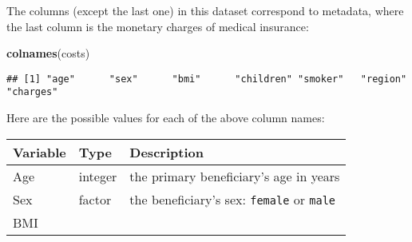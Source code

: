 \documentclass[]{article}
\newenvironment{Shaded}{\begin{snugshade}}{\end{snugshade}}
\newcommand{\KeywordTok}[1]{\textcolor[rgb]{0.13,0.29,0.53}{\textbf{#1}}}
\newcommand{\NormalTok}[1]{#1}
\begin{document}
The columns (except the last one) in this dataset correspond to
metadata, where the last column is the monetary charges of medical
insurance:

\begin{Shaded}
\begin{Highlighting}[]
\KeywordTok{colnames}\NormalTok{(costs)}
\end{Highlighting}
\end{Shaded}

\begin{verbatim}
## [1] "age"      "sex"      "bmi"      "children" "smoker"   "region"   "charges"
\end{verbatim}

Here are the possible values for each of the above column names:

\begin{longtable}[]{@{}lll@{}}
\toprule
\begin{minipage}[b]{0.27\columnwidth}\raggedright
Variable\strut
\end{minipage} & \begin{minipage}[b]{0.18\columnwidth}\raggedright
Type\strut
\end{minipage} & \begin{minipage}[b]{0.46\columnwidth}\raggedright
Description\strut
\end{minipage}\tabularnewline
\midrule
\endhead
\begin{minipage}[t]{0.27\columnwidth}\raggedright
Age\strut
\end{minipage} & \begin{minipage}[t]{0.18\columnwidth}\raggedright
integer\strut
\end{minipage} & \begin{minipage}[t]{0.46\columnwidth}\raggedright
the primary beneficiary's age in years\strut
\end{minipage}\tabularnewline
\begin{minipage}[t]{0.27\columnwidth}\raggedright
Sex\strut
\end{minipage} & \begin{minipage}[t]{0.18\columnwidth}\raggedright
factor\strut
\end{minipage} & \begin{minipage}[t]{0.46\columnwidth}\raggedright
the beneficiary's sex: \texttt{female} or \texttt{male}\strut
\end{minipage}\tabularnewline
\begin{minipage}[t]{0.27\columnwidth}\raggedright
BMI\strut
\end{minipage} & \begin{minipage}[t]{0.18\columnwidth}\raggedright

\end{minipage}
\end{longtable}
\end{document}
